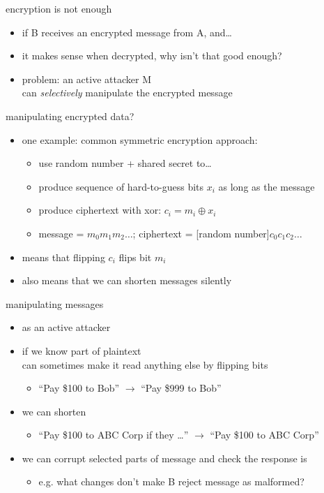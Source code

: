 \begin{frame}{encryption is not enough}
    \begin{itemize}
    \item if B receives an encrypted message from A, and\ldots
    \item it makes sense when decrypted, why isn't that good enough?
    \vspace{.5cm}
    \item problem: an active attacker M \\
        can \textit{selectively} manipulate the encrypted message
    \end{itemize}
\end{frame}

\begin{frame}{manipulating encrypted data?}
\begin{itemize}
\item one example: common symmetric encryption approach:
    \begin{itemize}
    \item use random number + shared secret to\ldots
    \item produce sequence of hard-to-guess bits $x_i$ as long as the message
    \item produce ciphertext with xor: $c_i = m_i \oplus x_i$
    \item message = $m_0m_1m_2\ldots$; ciphertext = [random number]$c_0c_1c_2\ldots$
    \end{itemize}
\item means that flipping $c_i$ flips bit $m_i$ 
\item also means that we can shorten messages silently
\end{itemize}
\end{frame}

\begin{frame}{manipulating messages}
\begin{itemize}
\item as an active attacker
\vspace{.5cm}
\item if we know part of plaintext \\
    can sometimes make it read anything else by flipping bits
    \begin{itemize}
    \item ``Pay \$100 to Bob'' $\rightarrow$ ``Pay \$999 to Bob''
    \end{itemize}
\item we can shorten 
    \begin{itemize}
    \item ``Pay \$100 to ABC Corp if they \ldots'' $\rightarrow$ ``Pay \$100 to ABC Corp''
    \end{itemize}
\item we can corrupt selected parts of message and check the response is
    \begin{itemize}
    \item e.g. what changes don't make B reject message as malformed?
    \end{itemize}
\end{itemize}
\end{frame}
